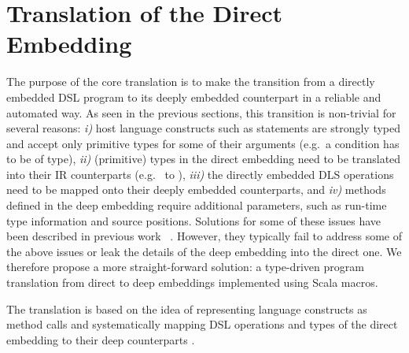 \documentclass[paper.tex]{subfiles}
\begin{document}
\section{Translation of the Direct Embedding}
\label{sec:translation}


The purpose of the core \tool translation is to make the transition from a directly embedded DSL program to its deeply embedded counterpart in a reliable and automated way.  As seen in the previous sections, this transition is non-trivial for several reasons: \emph{i)} host language constructs such as  statements are strongly typed and accept only primitive types for some of their arguments (e.g.\ a condition has to be of  type), \emph{ii)} (primitive) types in the direct embedding need to be translated into their IR counterparts (e.g.\  to ), \emph{iii)} the directly embedded DLS operations need to be mapped onto their deeply embedded counterparts, and \emph{iv)} methods defined in the deep embedding require additional parameters, such as run-time type information and source positions.  Solutions for some of these issues have been described in previous work%
~\cite{carette_finally_2009,hofer_polymorphic_2008,rompf_scala-virtualized:_2009,rompf_optimizing_2013,awesome}.  However, they typically fail to address some of the above issues or leak the details of the deep embedding into the direct one.    We therefore propose a more straight-forward solution: a type-driven program translation from direct to deep embeddings implemented using Scala macros.


The translation is based on the idea of representing language constructs as method calls \cite{carette_finally_2009,rompf_scala-virtualized:_2009} and systematically mapping DSL operations and types of the direct embedding to their deep counterparts \cite{carette_finally_2009}.
%
\end{document}
